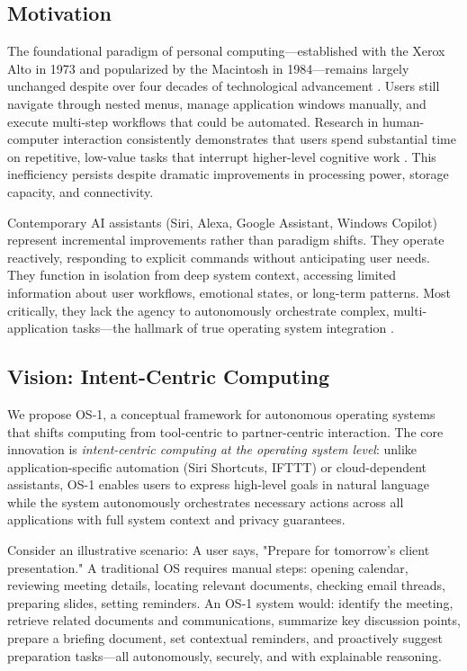 \documentclass[conference]{IEEEtran}
\begin{document}
\subsection{Motivation}

The foundational paradigm of personal computing—established with the Xerox Alto in 1973 and popularized by the Macintosh in 1984—remains largely unchanged despite over four decades of technological advancement \cite{myers1998brief}. Users still navigate through nested menus, manage application windows manually, and execute multi-step workflows that could be automated. Research in human-computer interaction consistently demonstrates that users spend substantial time on repetitive, low-value tasks that interrupt higher-level cognitive work \cite{horvitz1999principles}. This inefficiency persists despite dramatic improvements in processing power, storage capacity, and connectivity.

Contemporary AI assistants (Siri, Alexa, Google Assistant, Windows Copilot) represent incremental improvements rather than paradigm shifts. They operate reactively, responding to explicit commands without anticipating user needs. They function in isolation from deep system context, accessing limited information about user workflows, emotional states, or long-term patterns. Most critically, they lack the agency to autonomously orchestrate complex, multi-application tasks—the hallmark of true operating system integration \cite{amershi2019guidelines}.

\subsection{Vision: Intent-Centric Computing}

We propose OS-1, a conceptual framework for autonomous operating systems that shifts computing from tool-centric to partner-centric interaction. The core innovation is \textit{intent-centric computing at the operating system level}: unlike application-specific automation (Siri Shortcuts, IFTTT) or cloud-dependent assistants, OS-1 enables users to express high-level goals in natural language while the system autonomously orchestrates necessary actions across all applications with full system context and privacy guarantees.

Consider an illustrative scenario: A user says, "Prepare for tomorrow's client presentation." A traditional OS requires manual steps: opening calendar, reviewing meeting details, locating relevant documents, checking email threads, preparing slides, setting reminders. An OS-1 system would: identify the meeting, retrieve related documents and communications, summarize key discussion points, prepare a briefing document, set contextual reminders, and proactively suggest preparation tasks—all autonomously, securely, and with explainable reasoning.
\end{document}
